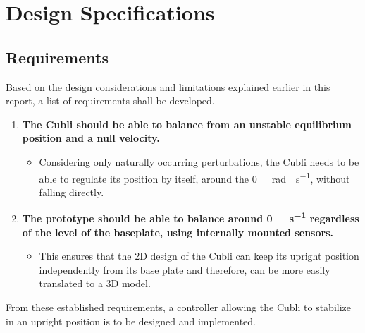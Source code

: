 \chapter{Design Specifications}\label{chap:specifications}


\section{Requirements}\label{requirements}
Based on the design considerations and limitations explained earlier in this report, a list of requirements shall be developed.
%
\begin{enumerate}
\item \textbf{The Cubli should be able to balance from an unstable equilibrium position and a null velocity.}
  \begin{itemize}
  \item[] Considering only naturally occurring perturbations, the Cubli needs to be able to regulate its position by itself, around the \si{0\ rad \cdot s^{-1}}, without falling directly.
  \end{itemize}

\item \textbf{The prototype should be able to balance around \si{0 \rad \cdot s^{-1}} regardless of the level of the baseplate, using internally mounted sensors.}  
  \begin{itemize}
  \item[] This ensures that the 2D design of the Cubli can keep its upright position independently from its base plate and therefore, can be more easily translated to a 3D model.
  \end{itemize}
%  
%  	
\end{enumerate}
%
From these established requirements, a controller allowing the Cubli to stabilize in an upright position is to be designed and implemented.

